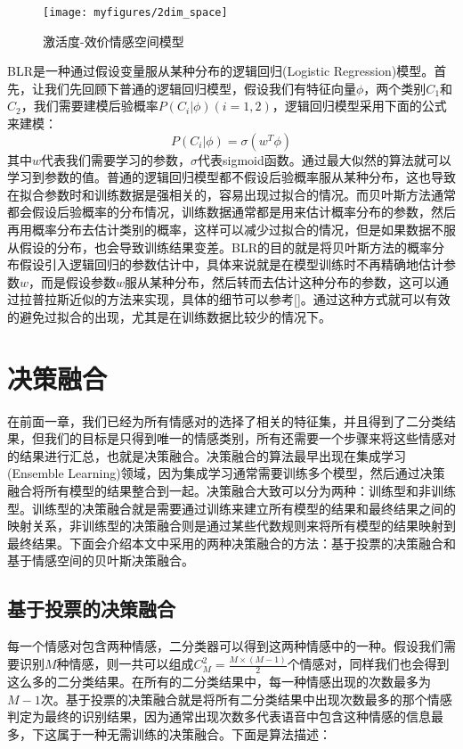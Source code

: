 \begin{figure}[H] %
    \centering
    \texttt{[image: myfigures/2dim\_space]}
    \caption{激活度-效价情感空间模型}
    \label{fig:xfig1}
\end{figure}

 BLR是一种通过假设变量服从某种分布的逻辑回归(Logistic Regression)模型。首先，让我们先回顾下普通的逻辑回归模型，假设我们有特征向量$\phi$，两个类别$C_1$和$C_2$，我们需要建模后验概率$P(C_i|\phi)(i=1,2)$，逻辑回归模型采用下面的公式来建模：
 \begin{equation}
\label{equ:lagrange_multiplier}
    P(C_i|\phi) = \sigma(w^T\phi)
\end{equation}
其中$w$代表我们需要学习的参数，$\sigma$代表sigmoid函数。通过最大似然的算法就可以学习到参数的值。普通的逻辑回归模型都不假设后验概率服从某种分布，这也导致在拟合参数时和训练数据是强相关的，容易出现过拟合的情况。而贝叶斯方法通常都会假设后验概率的分布情况，训练数据通常都是用来估计概率分布的参数，然后再用概率分布去估计类别的概率，这样可以减少过拟合的情况，但是如果数据不服从假设的分布，也会导致训练结果变差。BLR的目的就是将贝叶斯方法的概率分布假设引入逻辑回归的参数估计中，具体来说就是在模型训练时不再精确地估计参数$w$，而是假设参数$w$服从某种分布，然后转而去估计这种分布的参数，这可以通过拉普拉斯近似的方法来实现，具体的细节可以参考[]。通过这种方式就可以有效的避免过拟合的出现，尤其是在训练数据比较少的情况下。

\section{决策融合}
在前面一章，我们已经为所有情感对的选择了相关的特征集，并且得到了二分类结果，但我们的目标是只得到唯一的情感类别，所有还需要一个步骤来将这些情感对的结果进行汇总，也就是决策融合。决策融合的算法最早出现在集成学习(Ensemble Learning)领域，因为集成学习通常需要训练多个模型，然后通过决策融合将所有模型的结果整合到一起。决策融合大致可以分为两种：训练型和非训练型。训练型的决策融合就是需要通过训练来建立所有模型的结果和最终结果之间的映射关系，非训练型的决策融合则是通过某些代数规则来将所有模型的结果映射到最终结果。下面会介绍本文中采用的两种决策融合的方法：基于投票的决策融合和基于情感空间的贝叶斯决策融合。

\subsection{基于投票的决策融合}
每一个情感对包含两种情感，二分类器可以得到这两种情感中的一种。假设我们需要识别$M$种情感，则一共可以组成$C_M^2 = \frac{M \times (M - 1)}{2}$个情感对，同样我们也会得到这么多的二分类结果。在所有的二分类结果中，每一种情感出现的次数最多为$M-1$次。基于投票的决策融合就是将所有二分类结果中出现次数最多的那个情感判定为最终的识别结果，因为通常出现次数多代表语音中包含这种情感的信息最多，下这属于一种无需训练的决策融合。下面是算法描述：

